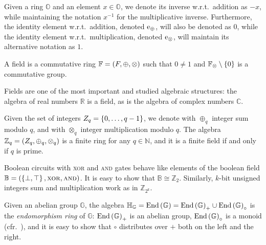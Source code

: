 Given a ring \(\mathbb{O}\) and an element \(x \in \mathbb{O}\), 
we denote its inverse w.r.t.\ addition as \(-x\), while maintaining the notation \(x^{-1}\) for 
the multiplicative inverse.
Furthermore, the identity element w.r.t.\ addition, denoted \(\mathrm{e}_{\oplus}\), will also be 
denoted as \(0\), while the identity element w.r.t.\ multiplication, denoted 
\(\mathrm{e}_{\otimes}\), will maintain its alternative notation as \(1\).

\begin{definition}[Field]
  A field is a commutative ring \(\mathbb{F} = \left(F, \oplus, \otimes\right)\) such that
  \(0 \neq 1\) and \(\mathbb{F}_{\otimes} \setminus \left\{0\right\}\) is a commutative group.
\end{definition}

Fields are one of the most important and studied algebraic structures: the algebra of real numbers 
\(\mathbb{R}\) is a field, as is the algebra of complex numbers \(\mathbb{C}\).
\begin{remark}
  Given the set of integers \(Z_q = \left\{0, \dots, q-1\right\}\), we denote with \(\oplus_q\) 
  integer sum modulo \(q\), and with \(\otimes_q\) integer multiplication modulo \(q\).
  The algebra \(\mathbb{Z}_q = \left(Z_q, \oplus_q, \otimes_q\right)\) is a finite ring for any 
  \(q \in \mathbb{N}\), and it is a finite field if and only if \(q\) is prime.
\end{remark}

\begin{example}
  Boolean circuits with \textsc{xor} and \textsc{and} gates behave like elements of the boolean 
  field \(\mathbb{B} = \left(\left\{\bot, \top\right\}, \mathbin{\textnormal{\textsc{xor}}}, \mathbin{\textnormal{\textsc{and}}}\right) \).
  It is easy to show that \(\mathbb{B} \cong \mathbb{Z}_2\).
  Similarly, \(k\)-bit unsigned integers sum and multiplication work as in \(\mathbb{Z}_{2^k}\).
\end{example}

\begin{example}
  Given an abelian group \(\mathbb{G}\), the algebra \(\mathbb{H}_{\mathbb{G}} = 
  \mathrm{End}\left(\mathbb{G}\right) = \mathrm{End}\left(\mathbb{G}\right)_{+} \cup \mathrm{End}\left(\mathbb{G}\right)_{\circ}\) 
  is the \emph{endomorphism ring} of \(\mathbb{G}\): \(\mathrm{End}\left(\mathbb{G}\right)_{+}\) is an abelian 
  group, \(\mathrm{End}\left(\mathbb{G}\right)_{\circ}\) is a monoid 
  (cfr.\ ), and it is easy to show that \(\circ \)
  distributes over \(+\) both on the left and the right.
\end{example}

